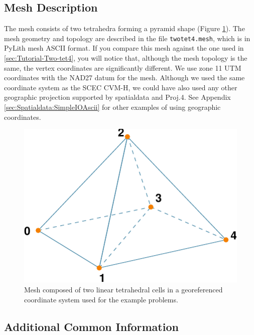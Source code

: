 \subsection{Mesh Description}

The mesh consists of two tetrahedra forming a pyramid shape (Figure
\ref{fig:twotet4-geoproj-mesh}). The mesh geometry and topology are
described in the file \texttt{twotet4.mesh}, which is in PyLith mesh
ASCII format. If you compare this mesh against the one used in \ref{sec:Tutorial-Two-tet4},
you will notice that, although the mesh topology is the same, the
vertex coordinates are significantly different. We use zone 11 UTM
coordinates with the NAD27 datum for the mesh. Although we used the
same coordinate system as the SCEC CVM-H, we could have also used
any other geographic projection supported by spatialdata and Proj.4.
See Appendix \ref{sec:Spatialdata:SimpleIOAscii} for other examples
of using geographic coordinates. 

\noindent \begin{center}
\begin{figure}
\begin{centering}
\includegraphics{tutorials/twocells/figs/twotet4-mesh}
\par\end{centering}

\caption{Mesh composed of two linear tetrahedral cells in a georeferenced coordinate
system used for the example problems.\label{fig:twotet4-geoproj-mesh}}
\end{figure}

\par\end{center}


\subsection{Additional Common Information}

